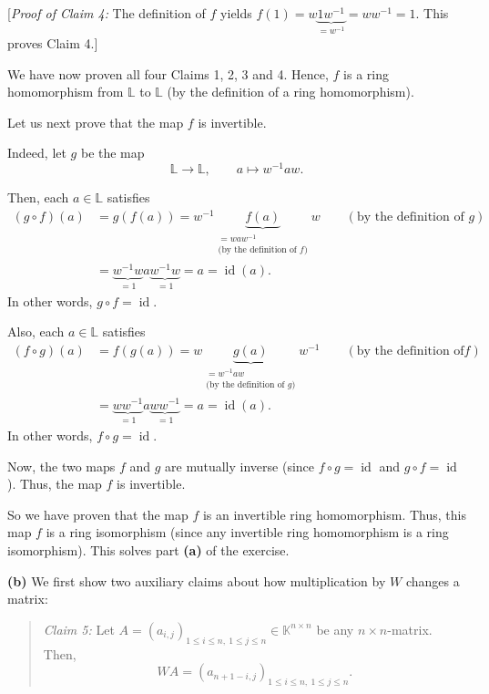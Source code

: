 \documentclass[paper=a4, fontsize=12pt]{scrartcl}%
\theoremstyle{plainsl}
\theoremstyle{definition}
\theoremstyle{remark}
\newenvironment{statement}{\begin{quote}}{\end{quote}}
\begin{document}
[\textit{Proof of Claim 4:} The definition of $f$ yields $f\left(  1\right)
=w\underbrace{1w^{-1}}_{=w^{-1}}=ww^{-1}=1$. This proves Claim 4.]

We have now proven all four Claims 1, 2, 3 and 4. Hence, $f$ is a ring
homomorphism from $\mathbb{L}$ to $\mathbb{L}$ (by the definition of a ring homomorphism).

Let us next prove that the map $f$ is invertible.

Indeed, let $g$ be the map%
\[
\mathbb{L}\rightarrow\mathbb{L},\qquad a\mapsto w^{-1}aw.
\]


Then, each $a\in\mathbb{L}$ satisfies%
\begin{align*}
\left(  g\circ f\right)  \left(  a\right)   &  =g\left(  f\left(  a\right)
\right)  =w^{-1}\underbrace{f\left(  a\right)  }_{\substack{=waw^{-1}%
\\\text{(by the definition of }f\text{)}}}w\qquad\left(  \text{by the
definition of }g\right) \\
&  =\underbrace{w^{-1}w}_{=1}a\underbrace{w^{-1}w}_{=1}=a=\operatorname*{id}%
\left(  a\right)  .
\end{align*}
In other words, $g\circ f=\operatorname*{id}$.

Also, each $a\in\mathbb{L}$ satisfies%
\begin{align*}
\left(  f\circ g\right)  \left(  a\right)   &  =f\left(  g\left(  a\right)
\right)  =w\underbrace{g\left(  a\right)  }_{\substack{=w^{-1}aw\\\text{(by
the definition of }g\text{)}}}w^{-1}\qquad\left(  \text{by the definition of
}f\right) \\
&  =\underbrace{ww^{-1}}_{=1}a\underbrace{ww^{-1}}_{=1}=a=\operatorname*{id}%
\left(  a\right)  .
\end{align*}
In other words, $f\circ g=\operatorname*{id}$.

Now, the two maps $f$ and $g$ are mutually inverse (since $f\circ
g=\operatorname*{id}$ and $g\circ f=\operatorname*{id}$). Thus, the map $f$ is invertible.

So we have proven that the map $f$ is an invertible ring homomorphism. Thus,
this map $f$ is a ring isomorphism (since any invertible ring homomorphism is
a ring isomorphism). This solves part \textbf{(a)} of the exercise.

\bigskip

\textbf{(b)} We first show two auxiliary claims about how multiplication by
$W$ changes a matrix:

\begin{statement}
\textit{Claim 5:} Let $A=\left(  a_{i,j}\right)  _{1\leq i\leq n,\ 1\leq j\leq
n}\in\mathbb{K}^{n\times n}$ be any $n\times n$-matrix. Then,%
\[
WA=\left(  a_{n+1-i,j}\right)  _{1\leq i\leq n,\ 1\leq j\leq n}.
\]

\end{statement}
\end{document}
